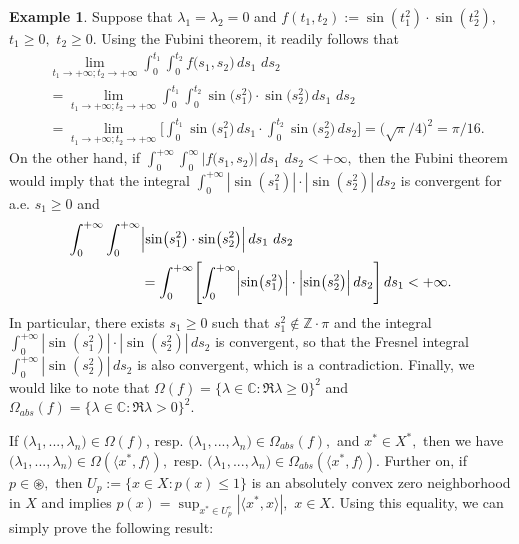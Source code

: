 \documentclass{amsart}
\theoremstyle{definition}
\newtheorem{example}[thm]{Example}
\theoremstyle{remark}
\numberwithin{equation}{section}
\begin{document}
\begin{example}\label{majst}
Suppose that $\lambda_{1}=\lambda_{2}=0$ and $f(t_{1},t_{2}):=\sin(t_{1}^{2}) \cdot \sin (t_{2}^{2}),$ $t_{1}\geq 0,$ $t_{2}\geq 0.$ Using the Fubini theorem, it readily follows that
\begin{align*}
& \lim_{t_{1}\rightarrow +\infty;t_{2}\rightarrow +\infty} \int^{t_{1}}_{0}\int^{t_{2}}_{0}f\bigl(s_{1},s_{2}\bigr)\, ds_{1}\,\, ds_{2}\\&=\lim_{t_{1}\rightarrow +\infty;t_{2}\rightarrow +\infty} \int^{t_{1}}_{0}\int^{t_{2}}_{0}\sin \bigl(s_{1}^{2}\bigr) \cdot \sin \bigl(s_{2}^{2}\bigr)\, ds_{1}\,\, ds_{2}\\ & =\lim_{t_{1}\rightarrow +\infty;t_{2}\rightarrow +\infty}\Biggl[\int^{t_{1}}_{0}\sin \bigl(s_{1}^{2}\bigr) \, ds_{1} \cdot \int^{t_{2}}_{0}\sin \bigl(s_{2}^{2}\bigr) \, ds_{2} \Biggr]=\bigl(\sqrt{\pi}/4\bigr)^{2}=\pi/16.
\end{align*}
On the other hand, if $\int^{+\infty}_{0}\int^{\infty}_{0}|f\bigl(s_{1},s_{2}\bigr)|\, ds_{1}\,\, ds_{2}<+\infty,$ then the Fubini theorem would imply that the integral $\int^{+\infty}_{0}| \sin (s_{1}^{2})|\cdot  | \sin (s_{2}^{2})|\, ds_{2}$ is convergent for a.e. $s_{1}\geq 0$ and
\begin{align*}
\int^{+\infty}_{0}\int^{+\infty}_{0}& \Bigl| \sin \bigl(s_{1}^{2}\bigr) \cdot \sin \bigl(s_{2}^{2}\bigr) \Bigr| \, ds_{1}\,\, ds_{2}\\&=\int^{+\infty}_{0}\Biggl[ \int^{+\infty}_{0}\Bigl| \sin \bigl(s_{1}^{2}\bigr)\Bigr|\cdot  \Bigl| \sin \bigl(s_{2}^{2}\bigr)\Bigr|\, ds_{2}\Biggr] \, ds_{1}<+\infty.
\end{align*}
In particular, there exists $s_{1}\geq 0$ such that $s_{1}^{2}\notin {\mathbb Z}\cdot \pi$ and the integral $\int^{+\infty}_{0}| \sin (s_{1}^{2})|\cdot  | \sin (s_{2}^{2})|\, ds_{2}$ is convergent, so that the Fresnel integral $\int^{+\infty}_{0} | \sin (s_{2}^{2})|\, ds_{2}$ is also convergent, which is a contradiction.
Finally, we would like to note that $\Omega (f) =\{\lambda \in {\mathbb C} : \Re \lambda \geq 0\}^{2}$ and $\Omega_{abs} (f) =\{\lambda \in {\mathbb C} : \Re \lambda > 0\}^{2}.$ 
\end{example}

If $(\lambda_{1},...,\lambda_{n}\bigr)\in \Omega(f)$, resp. $(\lambda_{1},...,\lambda_{n}\bigr)\in \Omega_{abs}(f),$ and $x^{\ast}\in X^{\ast},$ then we have $(\lambda_{1},...,\lambda_{n}\bigr)\in \Omega(\langle x^{\ast}, f\rangle),$ resp. $(\lambda_{1},...,\lambda_{n}\bigr)\in \Omega_{abs}(\langle x^{\ast}, f\rangle).$
Further on, if $p\in \circledast,$ then $U_{p}:=\{x\in X : p(x)\leq 1\}$ is an absolutely convex zero neighborhood in $X$ and \cite[Proposition 22.14, p. 256]{meise} implies 
$
p(x)=\sup_{x^{\ast}\in U_{p}^{\circ}}|\langle x^{\ast},x\rangle |,
$ $x\in X.$ Using this equality, we can simply prove the following result:
\end{document}
